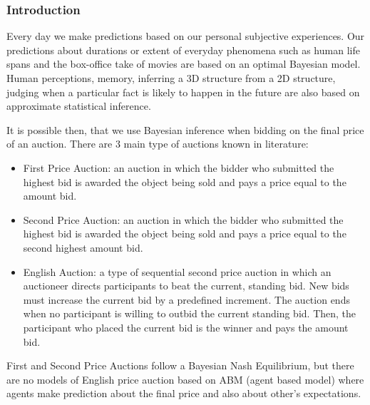 

\subsubsection{Introduction}
Every day we make predictions based on our personal subjective experiences.
Our predictions about durations or extent of everyday phenomena such as human
 life spans and the box-office take of movies are based on an optimal
Bayesian model\citep{OptimalPredEveryDay}.
Human perceptions, memory, inferring a 3D structure from a 2D structure,
judging when a particular fact is likely to happen in the future are also
 based on approximate statistical inference.

It is possible then, that we use Bayesian inference when bidding on the final
 price of an auction.
There are 3 main type of auctions known in literature\citep{AuctionTypes}:
\begin{itemize}
 \item First Price Auction: an auction in which the bidder who submitted the
 highest bid is awarded the object being sold and pays a price equal to the amount bid.

 \item Second Price Auction: an auction in which the bidder who submitted the
 highest bid is awarded the object being sold and pays a price equal to the second highest amount bid.

 \item English Auction: a type of sequential second price auction  in which an
 auctioneer directs participants to beat the current, standing bid. New bids must
 increase the current bid by a predefined increment. The auction ends when no
 participant is willing to outbid the current standing bid. Then, the participant
 who placed the current bid is the winner and pays the amount bid.
\end{itemize}

First and Second Price Auctions follow a Bayesian Nash Equilibrium, but there are
 no models of English price auction based on ABM (agent based model) where agents
 make prediction about the final price and also about other's expectations.

